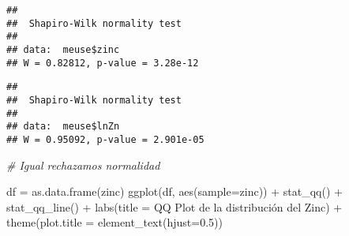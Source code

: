 \documentclass[
  12pt,
]{article}
\newenvironment{Shaded}{\begin{snugshade}}{\end{snugshade}}
\newcommand{\AttributeTok}[1]{\textcolor[rgb]{0.77,0.63,0.00}{#1}}
\newcommand{\CommentTok}[1]{\textcolor[rgb]{0.56,0.35,0.01}{\textit{#1}}}
\newcommand{\DecValTok}[1]{\textcolor[rgb]{0.00,0.00,0.81}{#1}}
\newcommand{\FloatTok}[1]{\textcolor[rgb]{0.00,0.00,0.81}{#1}}
\newcommand{\FunctionTok}[1]{\textcolor[rgb]{0.00,0.00,0.00}{#1}}
\newcommand{\NormalTok}[1]{#1}
\newcommand{\OtherTok}[1]{\textcolor[rgb]{0.56,0.35,0.01}{#1}}
\newcommand{\SpecialCharTok}[1]{\textcolor[rgb]{0.00,0.00,0.00}{#1}}
\newcommand{\StringTok}[1]{\textcolor[rgb]{0.31,0.60,0.02}{#1}}
\begin{document}
\begin{Shaded}
\end{Shaded}

\begin{verbatim}
## 
##  Shapiro-Wilk normality test
## 
## data:  meuse$zinc
## W = 0.82812, p-value = 3.28e-12
\end{verbatim}

\begin{Shaded}
\end{Shaded}

\begin{verbatim}
## 
##  Shapiro-Wilk normality test
## 
## data:  meuse$lnZn
## W = 0.95092, p-value = 2.901e-05
\end{verbatim}

\begin{Shaded}
\begin{Highlighting}[]
\CommentTok{\# Igual rechazamos normalidad}
\end{Highlighting}
\end{Shaded}

\begin{Shaded}
\begin{Highlighting}[]
\NormalTok{df }\OtherTok{=} \FunctionTok{as.data.frame}\NormalTok{(zinc)}
\FunctionTok{ggplot}\NormalTok{(df, }\FunctionTok{aes}\NormalTok{(}\AttributeTok{sample=}\NormalTok{zinc)) }\SpecialCharTok{+} \FunctionTok{stat\_qq}\NormalTok{() }\SpecialCharTok{+} \FunctionTok{stat\_qq\_line}\NormalTok{() }\SpecialCharTok{+} \FunctionTok{labs}\NormalTok{(}\AttributeTok{title =} \StringTok{\textquotesingle{}QQ Plot de la distribución del Zinc\textquotesingle{}}\NormalTok{) }\SpecialCharTok{+} \FunctionTok{theme}\NormalTok{(}\AttributeTok{plot.title =} \FunctionTok{element\_text}\NormalTok{(}\AttributeTok{hjust=}\FloatTok{0.5}\NormalTok{))}
\end{Highlighting}
\end{Shaded}
\end{document}

